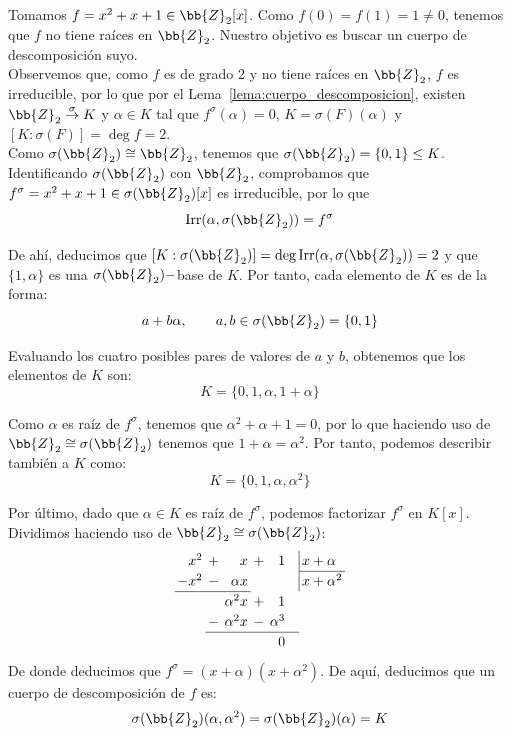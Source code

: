 \begin{ejemplo}
    Tomamos $f = x^2+x+1\in \bb{Z}_2[x]$. Como $f(0) = f(1) = 1 \neq 0$, tenemos que $f$ no tiene raíces en $\bb{Z}_2$. Nuestro objetivo es buscar un cuerpo de descomposición suyo.\\

    \noindent
    Observemos que, como $f$ es de grado 2 y no tiene raíces en $\bb{Z}_2$, $f$ es irreducible, por lo que 
    por el Lema~\ref{lema:cuerpo_descomposicion}, existen $\bb{Z}_2\stackrel{\sigma}{\to}K$ y $\alpha\in K$ tal que $f^\sigma(\alpha) = 0$, $K = \sigma(F)(\alpha)$ y $[K:\sigma(F)] = \deg f = 2$.\\

    Como $\sigma(\bb{Z}_2)\cong \bb{Z}_2$, tenemos que $\sigma(\bb{Z}_2)=\{0,1\}\leq K$. Identificando $\sigma(\bb{Z}_2)$ con $\bb{Z}_2$, comprobamos que $f^\sigma = x^2+x+1\in \sigma(\bb{Z}_2)[x]$ es irreducible, por lo que
    $$\Irr(\alpha,\sigma(\bb{Z}_2)) = f^\sigma
    $$

    De ahí, deducimos que $[K:\sigma(\bb{Z}_2)] = \deg \Irr(\alpha,\sigma(\bb{Z}_2)) = 2$ y que $\{1,\alpha\}$ es una $\sigma(\bb{Z}_2)-$base de $K$. Por tanto, cada elemento de $K$ es de la forma:
    \begin{equation*}
        a + b\alpha, \qquad a,b\in \sigma(\bb{Z}_2)=\{0,1\}
    \end{equation*}

    Evaluando los cuatro posibles pares de valores de $a$ y $b$, obtenemos que los elementos de $K$ son:
    \begin{equation*}
        K=\{0,1,\alpha,1+\alpha\}
    \end{equation*}

    Como $\alpha$ es raíz de $f^\sigma$, tenemos que $\alpha^2+\alpha+1=0$, por lo que haciendo uso de $\bb{Z}_2\cong \sigma(\bb{Z}_2)$ tenemos que $1+\alpha = \alpha^2$. Por tanto, podemos describir también a $K$ como:
    \begin{equation*}
        K=\{0,1,\alpha,\alpha^2\}
    \end{equation*}

    Por último, dado que $\alpha\in K$ es raíz de $f^\sigma$, podemos factorizar $f^\sigma$ en $K[x]$. Dividimos haciendo uso de $\bb{Z}_2\cong \sigma(\bb{Z}_2)$:
    \[
    \renewcommand{\arraystretch}{1.2}
    \setlength{\arraycolsep}{2pt}
    \begin{array}{rrrrr@{\quad}l}
    x^2 & + & x          & + & 1        & \multicolumn{1}{|l}{x + \alpha} \\ \cline{6-6}
    -x^2 & - & \alpha x   &   &          & \multicolumn{1}{|l}{x + \alpha^2} \\ \cline{1-3}
        &   & \alpha^2 x & + & 1        & \\
        & - & \alpha^2 x & - & \alpha^3 & \\ \cline{2-5}
        &   &            &   & 0        & 
    \end{array}
    \]
    De donde deducimos que $f^\sigma = (x+\alpha)(x+\alpha^2)$. De aquí, deducimos que un cuerpo de descomposición de $f$ es:
    $$\sigma(\bb{Z}_2)(\alpha, \alpha^2)=\sigma(\bb{Z}_2)(\alpha) = K$$
\end{ejemplo}

